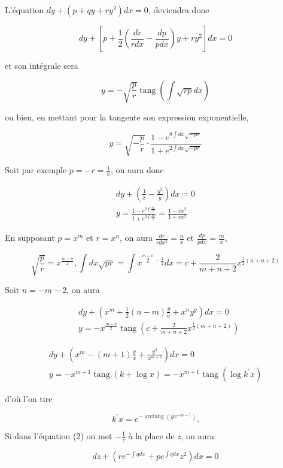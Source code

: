 \documentclass{article}
\begin{document}
L'équation \(d y+\left(p+q y+r y^{2}\right) d x=0\), deviendra done

\[
d y+\left[p+\frac{1}{2}\left(\frac{d r}{r d x}-\frac{d p}{p d x}\right) y+r y^{2}\right] d x=0
\]

et son intégrale sera

\[
y=-\sqrt{\frac{p}{r}} \operatorname{tang}\left(\int \sqrt{r p} d x\right)
\]

ou bien, en mettant pour la tangente son expression exponentielle,

\[
y=\sqrt{-\frac{p}{r}} \cdot \frac{1-e^{8 \int d x \sqrt{-p r}}}{1+e^{2 \int d x \sqrt{-p r}}}
\]

Soit par exemple \(p=-r=\frac{1}{x}\), on aura
donc

\[
\begin{gathered}
d y+\left(\frac{1}{x}-\frac{y^{2}}{y}\right) d x=0 \\
y=\frac{1-e^{2 \int \frac{d x}{x}}}{1+e^{2 \int \frac{d x}{x}}}=\frac{1-c x^{2}}{1+c x^{2}}
\end{gathered}
\]

En supposant \(p=x^{m}\) et \(r=x^{n}\), on aura \(\frac{d r}{r d x^{2}}=\frac{n}{x}\) et \(\frac{d p}{p d x}=\frac{m}{x}\),

\[
\sqrt{\frac{p}{r}}=x^{\frac{m-n}{2}}, \int d x \sqrt{p r}=\int x^{\stackrel{m+n}{2}-\frac{1}{2}} d x=c+\frac{2}{m+n+2} x^{\frac{1}{2}(n+n+2)}
\]

Soit \(n=-m-2\), on aura

\[
\begin{aligned}
& d y+\left(x^{m}+\frac{1}{2}(n-m) \frac{y}{a}+x^{n} y^{y}\right) d x=0 \\
& y=-x^{\frac{m-n}{2}} \operatorname{tang}\left(c+\frac{2}{m+n+2} x^{\frac{1}{2}(m+n+2)}\right)
\end{aligned}
\]

\[
\begin{gathered}
d y+\left(x^{m}-(m+1) \frac{y}{x}+\frac{y^{2}}{x^{m+2}}\right) d x=0 \\
y=-x^{m+1} \operatorname{tang}(k+\log x)=-x^{m+1} \operatorname{tang}\left(\log k^{\prime} x\right)
\end{gathered}
\]

d'où l'on tire

\[
k^{\prime} x=e^{-\operatorname{arctang}\left(y x^{-m-1}\right)} .
\]

Si dans l'équation (2) on met \(-\frac{1}{z}\) à la place de \(z\), on aura

\[
d z+\left(r e^{-\int q d x}+p e^{\int q d x} z^{2}\right) d x=0
\]
\end{document}

